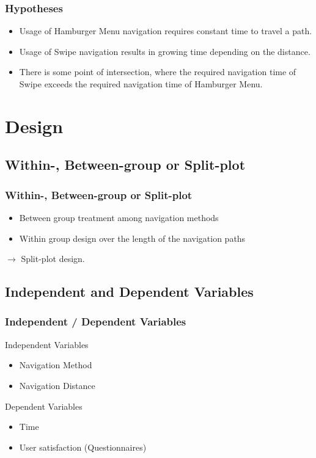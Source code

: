 \documentclass{beamer}
\begin{document}
\begin{frame}
        \frametitle{Hypotheses}
        \begin{itemize}
                \item Usage of Hamburger Menu navigation requires constant time to travel a path.
                \item Usage of Swipe navigation
                        results in growing time depending on the distance.
                \item There is some point of intersection,
                        where the required navigation time of Swipe exceeds the required navigation time of Hamburger Menu.
        \end{itemize}

\end{frame}


\section{Design}
\subsection{Within-, Between-group or Split-plot}
\begin{frame}
        \frametitle{Within-, Between-group or Split-plot}
        \begin{itemize}
                \item Between group treatment among navigation methods
                \item Within group design over the length of the navigation paths
        \end{itemize}
        $\rightarrow$ Split-plot design.
\end{frame}

\subsection{Independent and Dependent Variables}
\begin{frame}
        \frametitle{Independent / Dependent Variables}
        \begin{block}{Independent Variables}
                \begin{itemize}
                        \item Navigation Method
                        \item Navigation Distance
                \end{itemize}
        \end{block}
        \begin{block}{Dependent Variables}
                \begin{itemize}
                        \item Time
                        \item User satisfaction (Questionnaires)
                \end{itemize}
        \end{block}
\end{frame}
\end{document}
